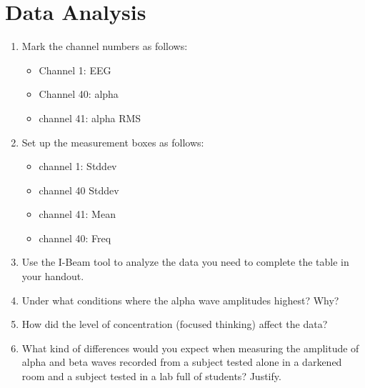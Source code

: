 \documentclass{article}
\begin{document}
\section*{Data Analysis}
\begin{enumerate}
	\item Mark the channel numbers as follows:\begin{itemize}
		\item Channel 1: EEG
		\item Channel 40: alpha
		\item channel 41: alpha RMS
	\end{itemize}
	
	\item Set up the measurement boxes as follows:\begin{itemize}
		\item channel 1: Stddev
		\item channel 40 Stddev
		\item channel 41: Mean
		\item channel 40: Freq
	\end{itemize}
	
	\item Use the I-Beam tool to analyze the data you need to complete the table in your handout.
	\item Under what conditions where the alpha wave amplitudes highest? Why?
	\item How did the level of concentration (focused thinking) affect the data?
	\item What kind of differences would you expect when measuring the amplitude of alpha and beta waves recorded from a subject tested alone in a darkened room and a subject tested in a lab full of students? Justify.
\end{enumerate}
\end{document}
